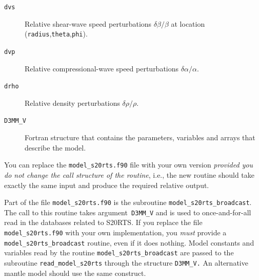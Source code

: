 \documentclass[oneside,english]{book}
\begin{document}
\begin{description}
\item [{\texttt{dvs}}] Relative shear-wave speed perturbations $\delta\beta/\beta$
at location (\texttt{radius},\texttt{theta},\texttt{phi}).
\item [{\texttt{dvp}}] Relative compressional-wave speed perturbations
$\delta\alpha/\alpha$.
\item [{\texttt{drho}}] Relative density perturbations $\delta\rho/\rho$.
\item [{\texttt{D3MM\_V}}] Fortran structure that contains the parameters,
variables and arrays that describe the model.
\end{description}
You can replace the \texttt{model\_s20rts.f90} file with your own
version \textit{provided you do not change the call structure of the
routine}, i.e., the new routine should take exactly the same input
and produce the required relative output.

Part of the file \texttt{model\_s20rts.f90} is the subroutine
\texttt{model\_s20rts\_broadcast}.
The call to this routine takes argument\texttt{ D3MM\_V} and is used
to once-and-for-all read in the databases related to S20RTS. If you
replace the file \texttt{model\_s20rts.f90} with your own implementation,
you \textit{must} provide a \texttt{model\_s20rts\_broadcast} routine,
even if it does nothing. Model constants and variables read by the
routine \texttt{model\_s20rts\_broadcast} are passed to the subroutine
\texttt{read\_model\_s20rts} through the structure \texttt{D3MM\_V.}
An alternative mantle model should use the same construct.
\end{document}
